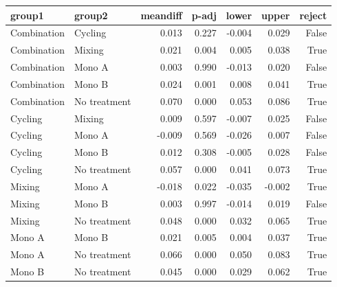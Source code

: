\begin{tabular}{llrrrrr}
\toprule
group1 & group2 & meandiff & p-adj & lower & upper & reject \\
\midrule
Combination & Cycling & 0.013 & 0.227 & -0.004 & 0.029 & False \\
Combination & Mixing & 0.021 & 0.004 & 0.005 & 0.038 & True \\
Combination & Mono A & 0.003 & 0.990 & -0.013 & 0.020 & False \\
Combination & Mono B & 0.024 & 0.001 & 0.008 & 0.041 & True \\
Combination & No treatment & 0.070 & 0.000 & 0.053 & 0.086 & True \\
Cycling & Mixing & 0.009 & 0.597 & -0.007 & 0.025 & False \\
Cycling & Mono A & -0.009 & 0.569 & -0.026 & 0.007 & False \\
Cycling & Mono B & 0.012 & 0.308 & -0.005 & 0.028 & False \\
Cycling & No treatment & 0.057 & 0.000 & 0.041 & 0.073 & True \\
Mixing & Mono A & -0.018 & 0.022 & -0.035 & -0.002 & True \\
Mixing & Mono B & 0.003 & 0.997 & -0.014 & 0.019 & False \\
Mixing & No treatment & 0.048 & 0.000 & 0.032 & 0.065 & True \\
Mono A & Mono B & 0.021 & 0.005 & 0.004 & 0.037 & True \\
Mono A & No treatment & 0.066 & 0.000 & 0.050 & 0.083 & True \\
Mono B & No treatment & 0.045 & 0.000 & 0.029 & 0.062 & True \\
\bottomrule
\end{tabular}
